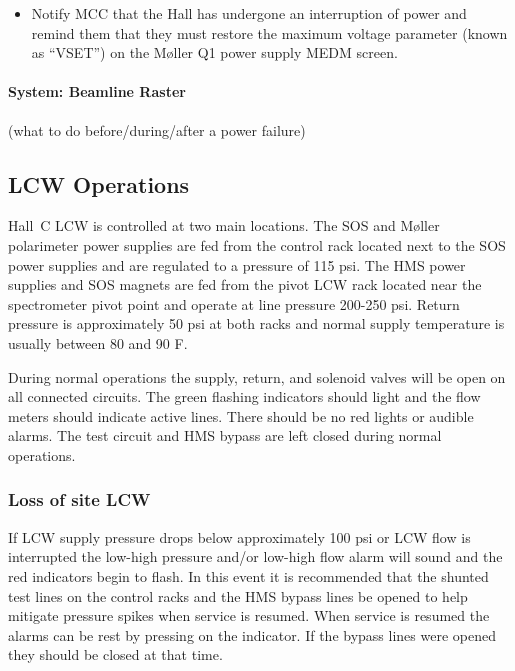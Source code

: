 {\begin{itemize}
\item Notify MCC that the Hall has undergone an interruption of power
and remind them that they must restore the maximum voltage parameter
(known as ``VSET'') on the M\o ller Q1 power supply MEDM screen.

\end{itemize}


\paragraph {System: Beamline Raster}
(what to do before/during/after a power failure)



\subsection{LCW Operations}

Hall~C LCW is controlled at two main locations.  The SOS and M\o ller
polarimeter power supplies are fed from the control rack located next to
the SOS power supplies and are regulated to a pressure of 115 psi.  The
HMS power supplies and SOS magnets are fed from the pivot LCW rack
located near the spectrometer pivot point and operate at line
pressure 200-250 psi.  Return pressure is approximately 50 psi at both
racks and normal supply temperature is usually between 80 and 90 F.

During normal operations the supply, return, and solenoid valves will be
open on all connected circuits.  The green flashing indicators should
light and the flow meters should indicate active lines.  There should be 
no red lights or audible alarms.  
The test circuit and HMS bypass are left closed during
normal operations.

\subsubsection{Loss of site LCW}

If LCW supply pressure drops below approximately 100 psi or LCW flow is
interrupted the low-high pressure and/or low-high flow alarm will sound
and the red indicators begin to flash.  In this event it is recommended
that the shunted test lines on the control racks and the HMS bypass
lines be opened to help mitigate pressure spikes when service is
resumed.  When service is resumed the alarms can be rest by pressing on
the indicator.  If the bypass lines were opened they should be closed at
that time.

}

